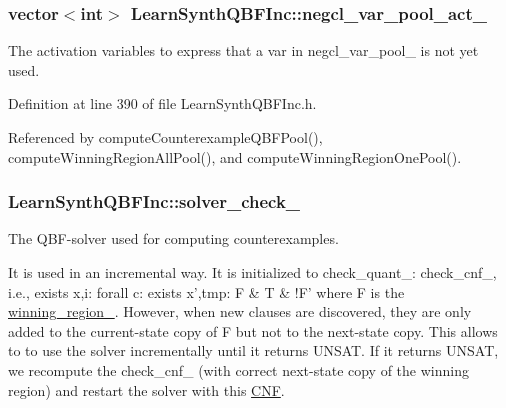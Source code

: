 \hypertarget{classLearnSynthQBFInc_aa9bc6dda9263e98fd3e5bfcfa9c062f9}{
\subsubsection[{negcl\-\_\-var\-\_\-pool\-\_\-act\-\_\-}]{\setlength{\rightskip}{0pt plus 5cm}vector$<$int$>$ Learn\-Synth\-Q\-B\-F\-Inc\-::negcl\-\_\-var\-\_\-pool\-\_\-act\-\_\-\hspace{0.3cm}{\ttfamily [protected]}}}\label{classLearnSynthQBFInc_aa9bc6dda9263e98fd3e5bfcfa9c062f9}


The activation variables to express that a var in negcl\-\_\-var\-\_\-pool\-\_\- is not yet used. 



Definition at line 390 of file Learn\-Synth\-Q\-B\-F\-Inc.\-h.



Referenced by compute\-Counterexample\-Q\-B\-F\-Pool(), compute\-Winning\-Region\-All\-Pool(), and compute\-Winning\-Region\-One\-Pool().

\hypertarget{classLearnSynthQBFInc_a687aa9738eafe0935a3f5c519f296fa9}{
\subsubsection[{solver\-\_\-check\-\_\-}]{ Learn\-Synth\-Q\-B\-F\-Inc\-::solver\-\_\-check\-\_\-\hspace{0.3cm}{\ttfamily [protected]}}}\label{classLearnSynthQBFInc_a687aa9738eafe0935a3f5c519f296fa9}


The Q\-B\-F-\/solver used for computing counterexamples. 

It is used in an incremental way. It is initialized to check\-\_\-quant\-\_\-\-: check\-\_\-cnf\-\_\-, i.\-e., exists x,i\-: forall c\-: exists x',tmp\-: F \& T \& !\-F' where F is the \hyperlink{classLearnSynthQBFInc_abc3503bdb6be7053a7c3d3d7e57858d6}{winning\-\_\-region\-\_\-}. However, when new clauses are discovered, they are only added to the current-\/state copy of F but not to the next-\/state copy. This allows to to use the solver incrementally until it returns U\-N\-S\-A\-T. If it returns U\-N\-S\-A\-T, we recompute the check\-\_\-cnf\-\_\- (with correct next-\/state copy of the winning region) and restart the solver with this \hyperlink{classCNF}{C\-N\-F}. 

